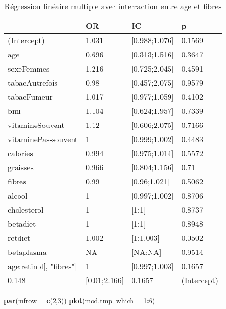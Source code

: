 \documentclass[]{article}
\newenvironment{Shaded}{\begin{snugshade}}{\end{snugshade}}
\newcommand{\KeywordTok}[1]{\textcolor[rgb]{0.13,0.29,0.53}{\textbf{#1}}}
\newcommand{\DataTypeTok}[1]{\textcolor[rgb]{0.13,0.29,0.53}{#1}}
\newcommand{\DecValTok}[1]{\textcolor[rgb]{0.00,0.00,0.81}{#1}}
\newcommand{\OperatorTok}[1]{\textcolor[rgb]{0.81,0.36,0.00}{\textbf{#1}}}
\newcommand{\NormalTok}[1]{#1}
\begin{document}
\begin{table}

\caption{\label{tab:unnamed-chunk-83}Régression linéaire multiple avec interraction entre age et fibres}
\centering
\begin{tabular}[t]{l|l|l|l}
\hline
  & OR & IC & p\\
\hline
\rowcolor[HTML]{BBD2E1}  (Intercept) & 1.031 & [0.988;1.076] & 0.1569\\
\hline
age & 0.696 & [0.313;1.516] & 0.3647\\
\hline
\rowcolor[HTML]{BBD2E1}  sexeFemmes & 1.216 & [0.725;2.045] & 0.4591\\
\hline
tabacAutrefois & 0.98 & [0.457;2.075] & 0.9579\\
\hline
\rowcolor[HTML]{BBD2E1}  tabacFumeur & 1.017 & [0.977;1.059] & 0.4102\\
\hline
bmi & 1.104 & [0.624;1.957] & 0.7339\\
\hline
\rowcolor[HTML]{BBD2E1}  vitamineSouvent & 1.12 & [0.606;2.075] & 0.7166\\
\hline
vitaminePas-souvent & 1 & [0.999;1.002] & 0.4483\\
\hline
\rowcolor[HTML]{BBD2E1}  calories & 0.994 & [0.975;1.014] & 0.5572\\
\hline
graisses & 0.966 & [0.804;1.156] & 0.71\\
\hline
\rowcolor[HTML]{BBD2E1}  fibres & 0.99 & [0.96;1.021] & 0.5062\\
\hline
alcool & 1 & [0.997;1.002] & 0.8706\\
\hline
\rowcolor[HTML]{BBD2E1}  cholesterol & 1 & [1;1] & 0.8737\\
\hline
betadiet & 1 & [1;1] & 0.8948\\
\hline
\rowcolor[HTML]{BBD2E1}  retdiet & 1.002 & [1;1.003] & 0.0502\\
\hline
betaplasma & NA & [NA;NA] & 0.9514\\
\hline
\rowcolor[HTML]{BBD2E1}  age:retinol[, "fibres"] & 1 & [0.997;1.003] & 0.1657\\
\hline
0.148 & [0.01;2.166] & 0.1657 & (Intercept)\\
\hline
\end{tabular}
\end{table}

\begin{Shaded}
\begin{Highlighting}[]
\KeywordTok{par}\NormalTok{(}\DataTypeTok{mfrow =} \KeywordTok{c}\NormalTok{(}\DecValTok{2}\NormalTok{,}\DecValTok{3}\NormalTok{))}
\KeywordTok{plot}\NormalTok{(mod.tmp, }\DataTypeTok{which =} \DecValTok{1}\OperatorTok{:}\DecValTok{6}\NormalTok{)}
\end{Highlighting}
\end{Shaded}
\end{document}
